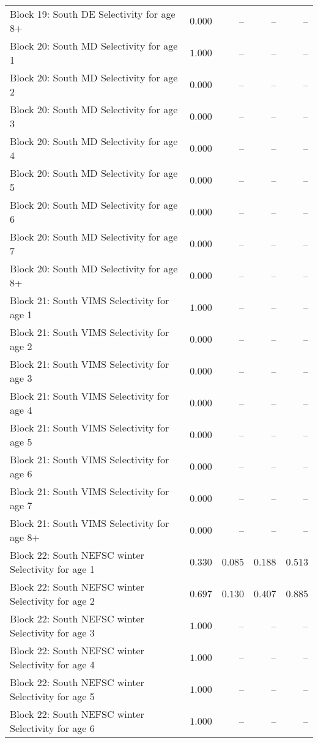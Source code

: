 \documentclass[
]{article}
\begin{document}
\begin{landscape}
\begin{longtable}[t]{lrrrr}
Block 19: South DE Selectivity for age 8+ & $0.000$ & -- & -- & --\\
Block 20: South MD Selectivity for age 1 & $1.000$ & -- & -- & --\\
\addlinespace
Block 20: South MD Selectivity for age 2 & $0.000$ & -- & -- & --\\
Block 20: South MD Selectivity for age 3 & $0.000$ & -- & -- & --\\
Block 20: South MD Selectivity for age 4 & $0.000$ & -- & -- & --\\
Block 20: South MD Selectivity for age 5 & $0.000$ & -- & -- & --\\
Block 20: South MD Selectivity for age 6 & $0.000$ & -- & -- & --\\
\addlinespace
Block 20: South MD Selectivity for age 7 & $0.000$ & -- & -- & --\\
Block 20: South MD Selectivity for age 8+ & $0.000$ & -- & -- & --\\
Block 21: South VIMS Selectivity for age 1 & $1.000$ & -- & -- & --\\
Block 21: South VIMS Selectivity for age 2 & $0.000$ & -- & -- & --\\
Block 21: South VIMS Selectivity for age 3 & $0.000$ & -- & -- & --\\
\addlinespace
Block 21: South VIMS Selectivity for age 4 & $0.000$ & -- & -- & --\\
Block 21: South VIMS Selectivity for age 5 & $0.000$ & -- & -- & --\\
Block 21: South VIMS Selectivity for age 6 & $0.000$ & -- & -- & --\\
Block 21: South VIMS Selectivity for age 7 & $0.000$ & -- & -- & --\\
Block 21: South VIMS Selectivity for age 8+ & $0.000$ & -- & -- & --\\
\addlinespace
Block 22: South NEFSC winter Selectivity for age 1 & $0.330$ & $0.085$ & $0.188$ & $0.513$\\
Block 22: South NEFSC winter Selectivity for age 2 & $0.697$ & $0.130$ & $0.407$ & $0.885$\\
Block 22: South NEFSC winter Selectivity for age 3 & $1.000$ & -- & -- & --\\
Block 22: South NEFSC winter Selectivity for age 4 & $1.000$ & -- & -- & --\\
Block 22: South NEFSC winter Selectivity for age 5 & $1.000$ & -- & -- & --\\
\addlinespace
Block 22: South NEFSC winter Selectivity for age 6 & $1.000$ & -- & -- & --\\

\end{longtable}
\end{landscape}
\end{document}
